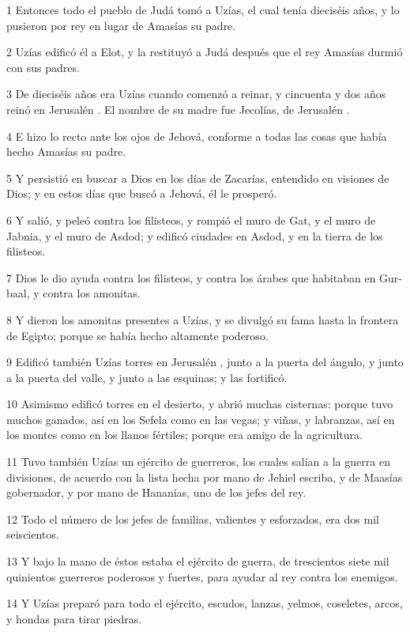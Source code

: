 \par 1 Entonces todo el pueblo de Judá tomó a Uzías, el cual tenía dieciséis años, y lo pusieron por rey en lugar de Amasías su padre.
\par 2 Uzías edificó él a Elot, y la restituyó a Judá después que el rey Amasías durmió con sus padres.
\par 3 De dieciséis años era Uzías cuando comenzó a reinar, y cincuenta y dos años reinó en Jerusalén . El nombre de su madre fue Jecolías, de Jerusalén .
\par 4 E hizo lo recto ante los ojos de Jehová, conforme a todas las cosas que había hecho Amasías su padre.
\par 5 Y persistió en buscar a Dios en los días de Zacarías, entendido en visiones de Dios; y en estos días que buscó a Jehová, él le prosperó.
\par 6 Y salió, y peleó contra los filisteos, y rompió el muro de Gat, y el muro de Jabnia, y el muro de Asdod; y edificó ciudades en Asdod, y en la tierra de los filisteos.
\par 7 Dios le dio ayuda contra los filisteos, y contra los árabes que habitaban en Gur-baal, y contra los amonitas.
\par 8 Y dieron los amonitas presentes a Uzías, y se divulgó su fama hasta la frontera de Egipto; porque se había hecho altamente poderoso.
\par 9 Edificó también Uzías torres en Jerusalén , junto a la puerta del ángulo, y junto a la puerta del valle, y junto a las esquinas; y las fortificó.
\par 10 Asimismo edificó torres en el desierto, y abrió muchas cisternas: porque tuvo muchos ganados, así en los Sefela como en las vegas; y viñas, y labranzas, así en los montes como en los llanos fértiles; porque era amigo de la agricultura.
\par 11 Tuvo también Uzías un ejército de guerreros, los cuales salían a la guerra en divisiones, de acuerdo con la lista hecha por mano de Jehiel escriba, y de Maasías gobernador, y por mano de Hananías, uno de los jefes del rey.
\par 12 Todo el número de los jefes de familias, valientes y esforzados, era dos mil seiscientos.
\par 13 Y bajo la mano de éstos estaba el ejército de guerra, de trescientos siete mil quinientos guerreros poderosos y fuertes, para ayudar al rey contra los enemigos.
\par 14 Y Uzías preparó para todo el ejército, escudos, lanzas, yelmos, coseletes, arcos, y hondas para tirar piedras.
